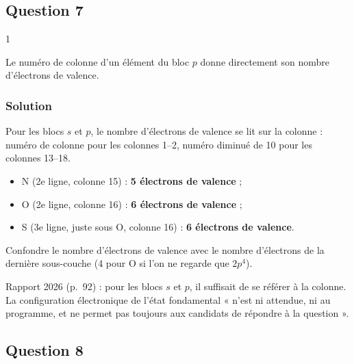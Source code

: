 \documentclass[11pt,a4paper]{article}
\providecommand{\tightlist}{\setlength{\itemsep}{0pt}\setlength{\parskip}{0pt}}
\begin{document}
\hypertarget{question-7}{%
\subsection{Question 7}\label{question-7}}

\begin{indication}{1}

Le numéro de colonne d'un élément du bloc \(p\) donne directement son nombre d'électrons de valence.

\end{indication}

\hypertarget{solution-6}{%
\subsubsection{Solution}\label{solution-6}}

Pour les blocs \(s\) et \(p\), le nombre d'électrons de valence se lit sur la colonne : numéro de colonne pour les colonnes 1--2, numéro diminué de 10 pour les colonnes 13--18.

\begin{itemize}
\tightlist
\item
  N (2e ligne, colonne 15) : \textbf{5 électrons de valence} ;
\item
  O (2e ligne, colonne 16) : \textbf{6 électrons de valence} ;
\item
  S (3e ligne, juste sous O, colonne 16) : \textbf{6 électrons de valence}.
\end{itemize}

\begin{piege}

Confondre le nombre d'électrons de valence avec le nombre d'électrons de la dernière sous-couche (4 pour O si l'on ne regarde que \(2p^4\)).

\end{piege}

\begin{jury}

Rapport 2026 (p.~92) : pour les blocs \(s\) et \(p\), il suffisait de se référer à la colonne. La configuration électronique de l'état fondamental « n'est ni attendue, ni au programme, et ne permet pas toujours aux candidats de répondre à la question ».

\end{jury}

\hypertarget{question-8}{%
\subsection{Question 8}\label{question-8}}
\end{document}
